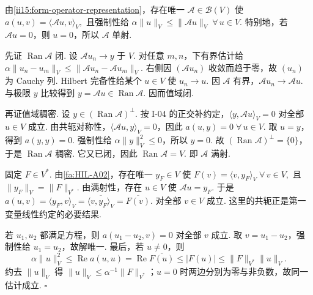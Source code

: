 \begin{FAProof}
由\autoref{ii15:form-operator-representation}，存在唯一 \(\displaystyle\mathcal A\in\mathcal B(V)\) 使 \(\displaystyle a(u,v) = \langle\mathcal Au,v\rangle_V,\)
且强制性给 \(\displaystyle \alpha\|u\|_V \leqslant \|\mathcal Au\|_V \; \forall\,u\in V.\)
特别地，若 \(\displaystyle\mathcal Au=0\)，则 \(\displaystyle u=0\)，所以 \(\displaystyle\mathcal A\) 单射.

先证 \(\displaystyle\operatorname{Ran}\mathcal A\) 闭. 设 \(\displaystyle\mathcal Au_n\to y\) 于 \(\displaystyle V\). 对任意 \(\displaystyle m,n\)，下有界估计给 \(\displaystyle \alpha\|u_n-u_m\|_V \leqslant \|\mathcal Au_n-\mathcal Au_m\|_V.\)
右侧因 \(\displaystyle(\mathcal Au_n)\) 收敛而趋于零，故 \(\displaystyle(u_n)\) 为 Cauchy 列. Hilbert 完备性给某个 \(\displaystyle u\in V\) 使 \(\displaystyle u_n\to u\). 因 \(\displaystyle\mathcal A\) 有界，\(\displaystyle\mathcal Au_n\to\mathcal Au\). 与极限 \(\displaystyle y\) 比较得到 \(\displaystyle y=\mathcal Au\in\operatorname{Ran}\mathcal A\). 因而值域闭.

再证值域稠密. 设 \(\displaystyle y\in(\operatorname{Ran}\mathcal A)^\perp\). 按 I-04 的正交补约定，\(\displaystyle\langle y,\mathcal Au\rangle_V=0\) 对全部 \(\displaystyle u\in V\) 成立. 由共轭对称性，\(\displaystyle\langle\mathcal Au,y\rangle_V=0\)，因此 \(\displaystyle a(u,y)=0 \; \forall\,u\in V.\)
取 \(\displaystyle u=y\)，得到 \(\displaystyle a(y,y)=0\). 强制性给 \(\displaystyle\alpha\|y\|_V^2\leqslant0\)，所以 \(\displaystyle y=0\). 故 \(\displaystyle(\operatorname{Ran}\mathcal A)^\perp=\{0\}\)，于是 \(\displaystyle\operatorname{Ran}\mathcal A\) 稠密. 它又已闭，因此 \(\displaystyle \operatorname{Ran}\mathcal A = V.\)
即 \(\displaystyle\mathcal A\) 满射.

固定 \(\displaystyle F\in V^*\). 由\autoref{fa:HIL-A02}，存在唯一 \(\displaystyle y_F\in V\) 使 \(\displaystyle F(v) = \langle v,y_F\rangle_V \; \forall\,v\in V,\)
且 \(\displaystyle\|y_F\|_V=\|F\|_{V^*}\). 由满射性，存在 \(\displaystyle u\in V\) 使 \(\displaystyle\mathcal Au=y_F\). 于是 \(\displaystyle a(u,v)=\langle y_F,v\rangle_V=\overline{\langle v,y_F\rangle_V}=\overline{F(v)}.\)
对全部 \(\displaystyle v\in V\) 成立. 这里的共轭正是第一变量线性约定的必要结果.

若 \(\displaystyle u_1,u_2\) 都满足方程，则 \(\displaystyle a(u_1-u_2,v)=0\) 对全部 \(\displaystyle v\) 成立. 取 \(\displaystyle v=u_1-u_2\)，强制性给 \(\displaystyle u_1=u_2\)，故解唯一. 最后，若 \(\displaystyle u\neq0\)，则
\[
\alpha\|u\|_V^2
\leqslant
\operatorname{Re}a(u,u)
=
\operatorname{Re}\overline{F(u)}
\leqslant
|F(u)|
\leqslant
\|F\|_{V^*}\|u\|_V.
\]
约去 \(\displaystyle\|u\|_V\) 得 \(\displaystyle\|u\|_V\leqslant\alpha^{-1}\|F\|_{V^*}\)；\(\displaystyle u=0\) 时两边分别为零与非负数，故同一估计成立.
\hfill\(\square\)
\end{FAProof}

